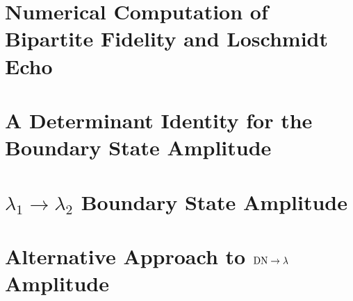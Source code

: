 \documentclass[preprint, prb]{revtex4-1}
\begin{document}
\section{Numerical Computation of Bipartite Fidelity and Loschmidt Echo}

\section{A Determinant Identity for the Boundary State Amplitude}
\label{app:pf_of_id}


\section{$\lambda_1 \rightarrow \lambda_2$ Boundary State Amplitude}
\label{app:lambda_12}


\section{Alternative Approach to ${\rm DN} \rightarrow \lambda$ Amplitude}
\label{app:gnd_dn_lambda}




\end{document}
